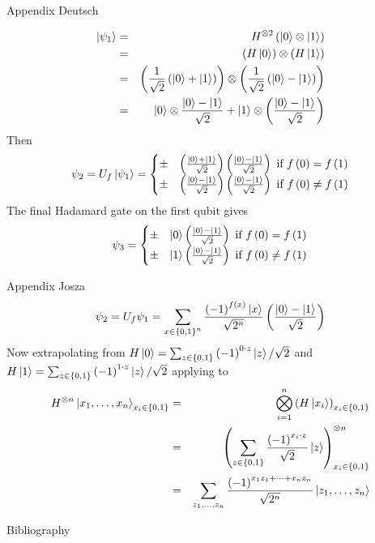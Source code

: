 \documentclass{beamer}
\begin{document}
\begin{frame}{Appendix Deutsch}

\begin{eqnarray*}
\Ket{\psi_{1}} & = & H^{\otimes2}\left(\Ket{0}\otimes\Ket{1}\right)\\
 & = & \left(H\Ket{0}\right)\otimes\left(H\Ket{1}\right)\\
 & = & \left(\frac{1}{\sqrt{2}}\left(\Ket{0}+\Ket{1}\right)\right)\otimes\left(\frac{1}{\sqrt{2}}\left(\Ket{0}-\Ket{1}\right)\right)\\
 & = & \Ket{0}\otimes\frac{\Ket{0}-\Ket{1}}{\sqrt{2}}+\Ket{1}\otimes\left(\frac{\Ket{0}-\Ket{1}}{\sqrt{2}}\right)
\end{eqnarray*}
Then 
\[
\psi_{2}=U_{f}\Ket{\psi_{1}}=\begin{cases}
\pm & \left(\frac{\Ket{0}+\Ket{1}}{\sqrt{2}}\right)\left(\frac{\Ket{0}-\Ket{1}}{\sqrt{2}}\right)\text{ if }f\left(0\right)=f\left(1\right)\\
\pm & \left(\frac{\Ket{0}-\Ket{1}}{\sqrt{2}}\right)\left(\frac{\Ket{0}-\Ket{1}}{\sqrt{2}}\right)\text{ if }f\left(0\right)\neq f\left(1\right)
\end{cases}
\]
The final Hadamard gate on the first qubit gives
\[
\psi_{3}=\begin{cases}
\pm & \Ket{0}\left(\frac{\Ket{0}-\Ket{1}}{\sqrt{2}}\right)\text{ if }f\left(0\right)=f\left(1\right)\\
\pm & \Ket{1}\left(\frac{\Ket{0}-\Ket{1}}{\sqrt{2}}\right)\text{ if }f\left(0\right)\neq f\left(1\right)
\end{cases}
\]
\end{frame}

\begin{frame}{Appendix Josza}
\[
\psi_{2}=U_{f}\psi_{1}=\sum_{x\in\left\{ 0,1\right\} ^{n}}\frac{\left(-1\right)^{f\left(x\right)}\Ket{x}}{\sqrt{2^{n}}}\left(\frac{\Ket{0}-\Ket{1}}{\sqrt{2}}\right)
\]
Now extrapolating from $H\Ket{0}=\sum_{z\in\left\{ 0,1\right\} }\left(-1\right)^{0\cdot z}\Ket{z}/\sqrt{2}$
and $H\Ket{1}=\sum_{z\in\left\{ 0,1\right\} }\left(-1\right)^{1\cdot z}\Ket{z}/\sqrt{2}$ applying
to 
\begin{eqnarray*}
H^{\otimes n}\Ket{x_{1},\dots,x_{n}}_{x_{i}\in\left\{ 0,1\right\} } & = & \bigotimes_{i=1}^{n}\left(H\Ket{x_{i}}\right)_{x_{i}\in\left\{ 0,1\right\} }\\
 & = & \left(\sum_{z\in\left\{ 0,1\right\} }\frac{\left(-1\right)^{x_{i}\cdot z}}{\sqrt{2}}\Ket{z}\right)_{x_{i}\in\left\{ 0,1\right\} }^{\otimes n}\\
 & = & \sum_{z_{1},\dots,z_{n}}\frac{\left(-1\right)^{x_{1}z_{1}+\cdots+x_{n}z_{n}}}{\sqrt{2^{n}}}\Ket{z_{1},\dots,z_{n}}
\end{eqnarray*}
\end{frame}



\begin{frame}{Bibliography}
 
\end{frame}
\end{document}
